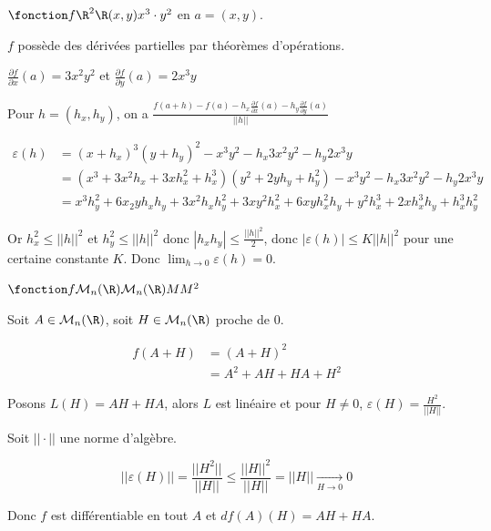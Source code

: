 \begin{exemple}
    $\fonction f {\R^2}{\R}{(x, y)}{x^3 \cdot y^2}$ en $a = (x, y)$. 

    $f$ possède des dérivées partielles par théorèmes d'opérations. 

    $\displaystyle \frac{\partial f }{\partial x} (a) = 3 x^2 y^2$ et $\displaystyle \frac{\partial f }{\partial y} (a) = 2 x^3 y$

    Pour $h = (h_x, h_y)$, on a
    $\displaystyle \frac{f(a + h) - f(a) - h_x \frac{\partial f }{\partial x }(a) - h_y \frac{\partial f}{\partial y }(a)}{||h||}$

    \begin{align}
        \varepsilon(h) & = (x + h_x)^3 (y + h_y)^2 - x^3 y^2 - h_x 3 x^2 y^2 - h_y 2 x^3 y \\
        & = (x^3 + 3x^2 h_x + 3x h_x^2 + h_x^3)(y^2 + 2 y h_y + h_y^2) - x^3 y^2 - h_x 3 x^2 y^2 - h_y 2 x^3 y \\
        & = x^3 h_y^2 + 6x_2y h_x h_y + 3 x^2 h_x h_y^2 + 3 x y^2 h_x^2 + 6 x y h_x^2 h_y + y^2 h_x^3 + 2 x h_x^3 h_y + h_x^3 h_y^2
    \end{align}

    Or $h_x^2 \leqslant ||h||^2$ et $h_y^2 \leqslant ||h||^2$ donc
    $|h_xh_y| \leqslant \frac{||h||^2}{2}$, 
    donc $|\varepsilon(h)| \leqslant K ||h||^2$ pour une certaine constante $K$.
    Donc $\displaystyle \lim_{h \to 0 } \varepsilon (h) = 0$.
\end{exemple}

\begin{exemple}
    $\fonction f {\mathcal M_n(\R)}{\mathcal{M}_n(\R)}{M}{M^2}$

    Soit $A \in \mathcal{M}_n(\R)$, soit $H \in \mathcal M_n(\R)$ proche de $0$.

    \begin{align}
        f(A + H) & = (A + H)^2 \\
        & = A^2 + AH + HA + H^2 
    \end{align}

    Posons $L(H) = AH + HA$, alors $L$ est linéaire et 
    pour $H \neq 0$, $\varepsilon (H) = \frac{H^2}{||H||}$.

    Soit $|| \cdot ||$ une norme d'algèbre. 

    $$||\varepsilon (H)|| = \frac{||H^2||}{||H||} \leqslant \frac{||H||^2}{||H||} = ||H|| \xrightarrow[H \to 0 ]{} 0$$

    Donc $f$ est différentiable en tout $A$ et $df(A)(H) = AH + HA$.
\end{exemple}

